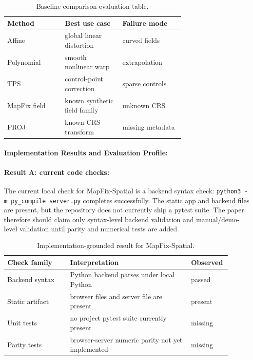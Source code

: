\documentclass{article}
\begin{document}
\begin{table}[t]
\centering
\caption{Baseline comparison evaluation table.}
\begin{tabular}{@{}p{0.24\linewidth}p{0.24\linewidth}p{0.24\linewidth}@{}}
\toprule
\textbf{Method} & \textbf{Best use case} & \textbf{Failure mode}\\
\midrule
Affine & global linear distortion & curved fields\\
Polynomial & smooth nonlinear warp & extrapolation\\
TPS & control-point correction & sparse controls\\
MapFix field & known synthetic field family & unknown CRS\\
PROJ & known CRS transform & missing metadata\\
\bottomrule
\end{tabular}
\end{table}

\paragraph{Implementation Results and Evaluation Profile:}

\paragraph{Result A: current code checks:}

The current local check for MapFix-Spatial is a backend syntax check: \texttt{python3 -m py\_compile server.py} completes successfully. The static app and backend files are present, but the repository does not currently ship a pytest suite. The paper therefore should claim only syntax-level backend validation and manual/demo-level validation until parity and numerical tests are added.

\begin{table}[t]
\centering
\caption{Implementation-grounded result for MapFix-Spatial.}
\begin{tabular}{@{}p{0.27\linewidth}p{0.52\linewidth}p{0.12\linewidth}@{}}
\toprule
\textbf{Check family} & \textbf{Interpretation} & \textbf{Observed}\\
\midrule
Backend syntax & Python backend parses under local Python & passed\\
Static artifact & browser files and server file are present & present\\
Unit tests & no project pytest suite currently present & missing\\
Parity tests & browser-server numeric parity not yet implemented & missing\\
\bottomrule
\end{tabular}
\end{table}
\end{document}
